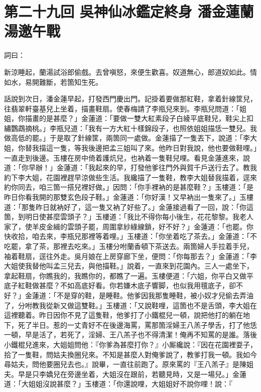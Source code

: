
\chapter*{第二十九回 吳神仙冰鑑定終身 潘金蓮蘭湯邀午戰}


詞曰：

\begin{myquote}
新涼睡起，蘭湯試浴郎偷戲。去曾嗔怒，來便生歡喜。奴道無心，郎道奴如此。情如水，易開難斷，若箇知生死。

\end{myquote}

話說到次日，潘金蓮早起，打發西門慶出門。記掛着要做那紅鞋，{}拿着針線筐兒，往翡翠軒臺基兒上坐着，描畫鞋扇。使春梅請了李瓶兒來到。李瓶兒問道：「姐姐，你描畫的是甚麼？」金蓮道：「要做一雙大紅素段子白綾平底鞋兒，鞋尖上扣繡鸚鵡摘桃。」李瓶兒道：「我有一方大紅十樣錦段子，也照依姐姐描恁一雙兒。我做高低的罷。」于是取了針線筐，兩箇同一處做。金蓮描了一隻丟下，說道：「李大姐，你替我描這一隻，等我後邊把孟三姐叫了來。他昨日對我說，他也要做鞋哩。」一直走到後邊。玉樓在房中倚着護炕兒，也衲着一隻鞋兒哩。看見金蓮進來，說道：「你早辦！」金蓮道：「我起來的早，打發他爹往門外與賀千戶送行去了。教我約下李大姐，花園裡趕早涼做些生活。我纔描了一隻鞋，教李大姐替我描着，逕來約你同去，咱三箇一搭兒裡好做。」因問：「你手裡衲的是甚麼鞋？」玉樓道：「是昨日你看我開的那雙玄色段子鞋。」金蓮道：「你好漢！又早衲出一隻來了。」玉樓道：「那隻昨日就衲好了，這一隻又衲了好些了。」金蓮接過看了一回，說：「你這箇，到明日使甚麼雲頭子？」玉樓道：「我比不得你每小後生，花花黎黎。{}我老人家了，使羊皮金緝的雲頭子罷，周圍拿紗綠線鎖，好不好？」金蓮道：「也罷。你快收拾，咱去來，李瓶兒那裡等着哩。」玉樓道：「你坐着吃了茶去。」金蓮道：「不吃罷，拿了茶，那裡去吃來。」玉樓分咐蘭香頓下茶送去。兩箇婦人手拉着手兒，袖着鞋扇，逕往外走。吳月娘在上房穿廊下坐，便問：「你每那去？」金蓮道：「李大姐使我替他叫孟三兒去，與他描鞋。」{}說着，一直來到花園內。三人一處坐下，拿起鞋扇，你瞧我的，我瞧你的，{}都瞧了一遍。玉樓便道：「六姐，你平白又做平底子紅鞋做甚麼？不如高底好看。你若嫌木底子響脚，也似我用氊底子，卻不好？」{}金蓮道：「不是穿的鞋，是睡鞋。他爹因我那隻睡鞋，被小奴才兒偷去弄油了，分咐教我從新又做這雙鞋。」玉樓道：「又說鞋哩，這箇也不是舌頭，李大姐在這裡聽着。昨日因你不見了這隻鞋，他爹打了小鐵棍兒一頓，說把他打的躺在地下，死了半日。惹的一丈青好不在後邊海罵，罵那箇淫婦王八羔子學舌，打了他恁一頓，早是活了，若死了，淫婦、王八羔子也不得清潔！俺再不知罵的是誰。落後小鐵棍兒進來，大姐姐問他：『你爹為甚麼打你？』小厮纔說：『因在花園裡耍子，拾了一隻鞋，問姑夫換圈兒來。不知是甚麼人對俺爹說了，教爹打我一頓。我如今尋姑夫，問他要圈兒去也。』說畢，一直往前跑了。原來罵的『王八羔子』是陳姐夫。{}早是只李嬌兒在旁邊坐着，大姐沒在跟前，若聽見時，又是一場兒。」金蓮道：「大姐姐沒說甚麼？」玉樓道：「你還說哩，大姐姐好不說你哩！說：『